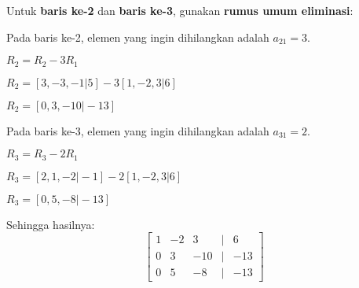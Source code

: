 \documentclass{article}
\begin{document}
\begin{enumerate}
\begin{enumerate}
\begin{enumerate}
        \end{enumerate}

        \vspace{1em}

        Untuk \textbf{baris ke-2} dan \textbf{baris ke-3}, gunakan \textbf{rumus umum eliminasi}:

        \vspace{1em}

        Pada baris ke-2, elemen yang ingin dihilangkan adalah \( a_{21} = 3 \).

        \(R_2 = R_2 - 3R_1\)

        \(R_2 = [3, -3, -1 \vert 5] - 3[1, -2, 3 \vert 6]\)

        \(R_2 = [0, 3, -10 \vert -13]\)

        \vspace{1em}
        
        Pada baris ke-3, elemen yang ingin dihilangkan adalah \( a_{31} = 2 \).

        \(R_3 = R_3 - 2R_1\)

        \(R_3 = [2, 1, -2 \vert -1] - 2[1, -2, 3 \vert 6]\)

        \(R_3 = [0, 5, -8 \vert -13]\)

        Sehingga hasilnya:
        \[
        \begin{bmatrix}
        1 & -2 & 3 & \vert & 6 \\
        0 & 3 & -10 & \vert & -13 \\
        0 & 5 & -8 & \vert & -13
        \end{bmatrix}
        \]

        \vspace{1em}
    \end{enumerate}
\end{enumerate}
\end{document}
